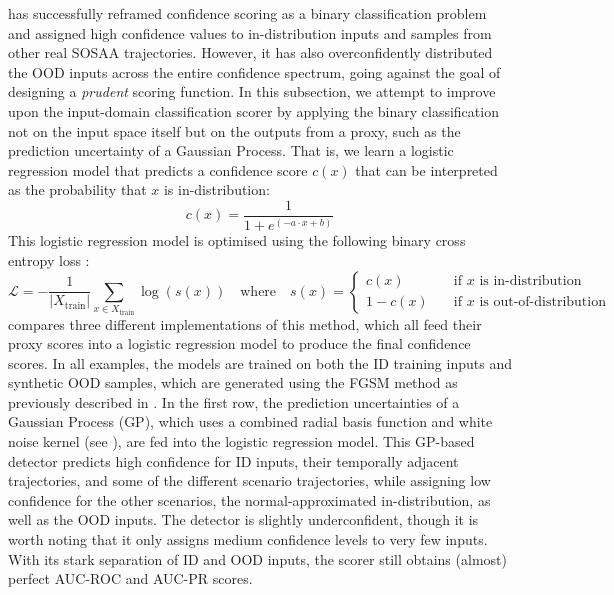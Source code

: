  has successfully reframed confidence scoring as a binary classification problem and assigned high confidence values to in-distribution inputs and samples from other real SOSAA trajectories. However, it has also overconfidently distributed the OOD inputs across the entire confidence spectrum, going against the goal of designing a \textit{prudent} scoring function. In this subsection, we attempt to improve upon the input-domain classification scorer by applying the binary classification not on the input space itself but on the outputs from a proxy, such as the prediction uncertainty of a Gaussian Process. That is, we learn a logistic regression model that predicts a confidence score $c(x)$ that can be interpreted as the probability that $x$ is in-distribution:
\begin{equation*}
    c(x) = \frac{1}{1 + e^{(-a \cdot x + b)}}
\end{equation*}
This logistic regression model is optimised using the following binary cross entropy loss \cite{statistical-learning-2009}:
\begin{equation*}
    \mathcal{L} = -\frac{1}{|X_{\text{train}}|} \sum_{x \in X_{\text{train}}}{\log(s(x))} \quad \text{where} \quad s(x) = \begin{cases}
        c(x) &\quad \text{if } x \text{ is in-distribution} \\
        1-c(x) &\quad \text{if } x \text{ is out-of-distribution}
    \end{cases}
\end{equation*}
\noindent {} compares three different implementations of this method, which all feed their proxy scores into a logistic regression model to produce the final confidence scores. In all examples, the models are trained on both the ID training inputs and synthetic OOD samples, which are generated using the FGSM method as previously described in . In the first row, the prediction uncertainties of a Gaussian Process (GP), which uses a combined radial basis function and white noise kernel (see ), are fed into the logistic regression model. This GP-based detector predicts high confidence for ID inputs, their temporally adjacent trajectories, and some of the different scenario trajectories, while assigning low confidence for the other scenarios, the normal-approximated in-distribution, as well as the OOD inputs. The detector is slightly underconfident, though it is worth noting that it only assigns medium confidence levels to very few inputs. With its stark separation of ID and OOD inputs, the scorer still obtains (almost) perfect AUC-ROC and AUC-PR scores.

